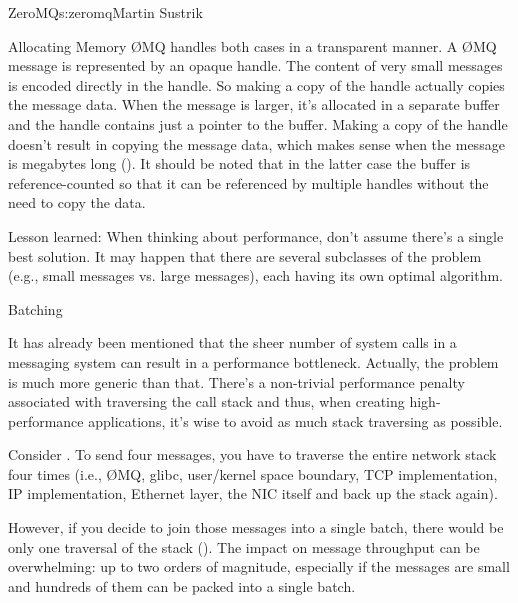 \begin{aosachapter}{ZeroMQ}{s:zeromq}{Martin Sustrik}
\begin{aosasect1}{Allocating Memory}
{\O}MQ handles both cases in a transparent manner. A {\O}MQ message is
represented by an opaque handle. The content of very small messages is
encoded directly in the handle. So making a copy of the handle
actually copies the message data. When the message is larger, it's
allocated in a separate buffer and the handle contains just a pointer to
the buffer. Making a copy of the handle doesn't result in copying the
message data, which makes sense when the message
is megabytes long (). It should be noted
that in the latter case the buffer is reference-counted so that it can
be referenced by multiple handles without the need to copy the data.


Lesson learned: When thinking about performance, don't assume there's
a single best solution. It may happen that there are several
subclasses of the problem (e.g., small messages vs. large messages),
each having its own optimal algorithm.

\end{aosasect1}

\begin{aosasect1}{Batching}

It has already been mentioned that the sheer number of system calls in
a messaging system can result in a performance bottleneck. Actually,
the problem is much more generic than that. There's a non-trivial
performance penalty associated with traversing the call stack and
thus, when creating high-performance applications, it's wise to avoid
as much stack traversing as possible.


Consider .  To send four messages, you
have to traverse the entire network stack four times (i.e., {\O}MQ, glibc,
user/kernel space boundary, TCP implementation, IP implementation,
Ethernet layer, the NIC itself and back up the stack again). 

However,
if you decide to join those messages into a single batch, there would
be only one traversal of the stack ().
The impact on message throughput can be overwhelming: up to two orders
of magnitude, especially if the messages are small and hundreds of
them can be packed into a single batch.



\end{aosasect1}
\end{aosachapter}
